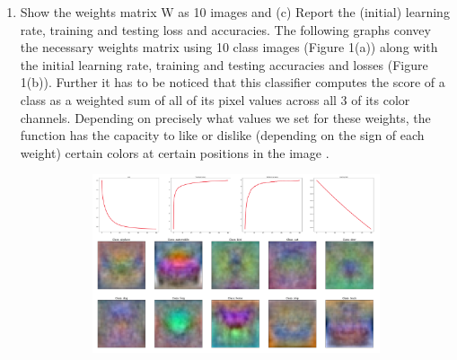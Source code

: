 \documentclass[11pt]{scrartcl}
\begin{document}
{\begin{enumerate}[label=(\alph*)]
In python implementation, the weights matrix is initiated with random weights which are obtained through an influence of a standard (normal) curve along with the bias vector, which is a zero vector initially. Afterwards, the training and test samples are re-arranged such that the matrix multiplication is much simplified and effective by combining into a single matrix. In corresponding, the same is implemented on the weight and bias matrices. The initial learning rate is chosen to be $1.4X10^{-2}$ and the gradient descent is executed in the forward propagation (with the loss function of mean sum of squared errors function to quantify the agreement between the predicted scores and the ground truth labels) and the backward propagation of evaluating the differentiated values of weights. The accuracies are calculated using a custom function and the evaluated values of each learning and loss parameters are stored in dedicated arrays in order to visualize.
\item Show the weights matrix W as 10 images and (c) Report the (initial) learning rate, training and testing loss and accuracies.
\newline The following graphs convey the necessary weights matrix using 10 class images (Figure 1(a)) along with the initial learning rate, training and testing accuracies and losses (Figure 1(b)). Further it has to be noticed that this classifier computes the score of a class as a weighted sum of all of its pixel values across all 3 of its color channels. Depending on precisely what values we set for these weights, the function has the capacity to like or dislike (depending on the sign of each weight) certain colors at certain positions in the image \cite{web1}.
\begin{figure}[H]
\centering
\begin{subfigure}{.5\textwidth}
  \centering
  \includegraphics[width=0.9\linewidth]{1_2.PNG}

\end{subfigure}
\end{figure}
\end{enumerate}}
\end{document}
